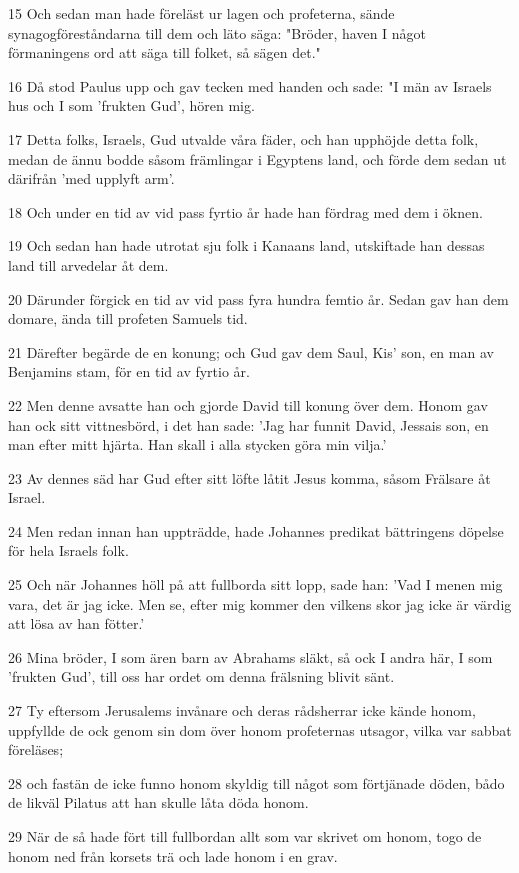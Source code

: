 \par 15 Och sedan man hade föreläst ur lagen och profeterna, sände synagogföreståndarna till dem och läto säga: "Bröder, haven I något förmaningens ord att säga till folket, så sägen det."
\par 16 Då stod Paulus upp och gav tecken med handen och sade: "I män av Israels hus och I som 'frukten Gud', hören mig.
\par 17 Detta folks, Israels, Gud utvalde våra fäder, och han upphöjde detta folk, medan de ännu bodde såsom främlingar i Egyptens land, och förde dem sedan ut därifrån 'med upplyft arm'.
\par 18 Och under en tid av vid pass fyrtio år hade han fördrag med dem i öknen.
\par 19 Och sedan han hade utrotat sju folk i Kanaans land, utskiftade han dessas land till arvedelar åt dem.
\par 20 Därunder förgick en tid av vid pass fyra hundra femtio år. Sedan gav han dem domare, ända till profeten Samuels tid.
\par 21 Därefter begärde de en konung; och Gud gav dem Saul, Kis' son, en man av Benjamins stam, för en tid av fyrtio år.
\par 22 Men denne avsatte han och gjorde David till konung över dem. Honom gav han ock sitt vittnesbörd, i det han sade: 'Jag har funnit David, Jessais son, en man efter mitt hjärta. Han skall i alla stycken göra min vilja.'
\par 23 Av dennes säd har Gud efter sitt löfte låtit Jesus komma, såsom Frälsare åt Israel.
\par 24 Men redan innan han uppträdde, hade Johannes predikat bättringens döpelse för hela Israels folk.
\par 25 Och när Johannes höll på att fullborda sitt lopp, sade han: 'Vad I menen mig vara, det är jag icke. Men se, efter mig kommer den vilkens skor jag icke är värdig att lösa av han fötter.'
\par 26 Mina bröder, I som ären barn av Abrahams släkt, så ock I andra här, I som 'frukten Gud', till oss har ordet om denna frälsning blivit sänt.
\par 27 Ty eftersom Jerusalems invånare och deras rådsherrar icke kände honom, uppfyllde de ock genom sin dom över honom profeternas utsagor, vilka var sabbat föreläses;
\par 28 och fastän de icke funno honom skyldig till något som förtjänade döden, bådo de likväl Pilatus att han skulle låta döda honom.
\par 29 När de så hade fört till fullbordan allt som var skrivet om honom, togo de honom ned från korsets trä och lade honom i en grav.
